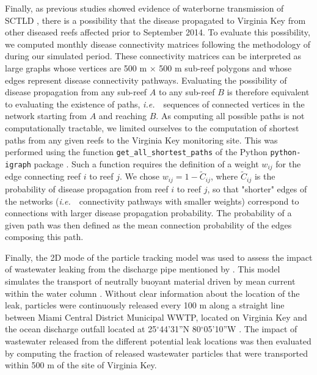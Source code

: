 \documentclass[preprint,12pt,authoryear]{elsarticle}
\newcommand{\ie}{{\it i.e.}\ }
\begin{document}
Finally, as previous studies showed evidence of waterborne transmission of SCTLD \citep{aeby2019pathogenesis, dobbelaere2020coupled,eaton2021measuring, meiling2021variable}, there is a possibility that the disease propagated to Virginia Key from other diseased reefs affected prior to September 2014. To evaluate this possibility, we computed monthly disease connectivity matrices following the methodology of \cite{dobbelaere2020coupled} during our simulated period. These connectivity matrices can be interpreted as large graphs whose vertices are 500 m $\times$ 500 m sub-reef polygons and whose edges represent disease connectivity pathways. Evaluating the possibility of disease propagation from any sub-reef $A$ to any sub-reef $B$ is therefore equivalent to evaluating the existence of paths, \ie~sequences of connected vertices in the network starting from $A$ and reaching $B$. As computing all possible paths is not computationally tractable, we limited ourselves to the computation of shortest paths from any given reefs to the Virginia Key monitoring site. This was performed using the function \texttt{get\_all\_shortest\_paths} of the Python \texttt{python-igraph} package \citep{csardi2006igraph}. Such a function requires the definition of a weight $w_{ij}$ for the edge connecting reef $i$ to reef $j$. We chose $w_{ij} = 1-\tilde{C}_{ij}$, where $\tilde{C}_{ij}$ is the probability of disease propagation from reef $i$ to reef $j$, so that "shorter" edges of the networks (\ie~connectivity pathways with smaller weights) correspond to connections with larger disease propagation probability. The probability of a given path was then defined as the mean connection probability of the edges composing this path.

Finally, the 2D mode of the particle tracking model was used to assess the impact of wastewater leaking from the discharge pipe mentioned by \cite{gintert2019regional}. This model simulates the transport of neutrally buoyant material driven by mean current within the water column \citep{dobbelaere2020coupled}. Without clear information about the location of the leak, particles were continuously released every 100 m along a straight line between Miami Central District Municipal WWTP, located on Virginia Key and the ocean discharge outfall located at 25$^\circ$44'31''N 80$^\circ$05'10''W \citep{koopman2006ocean}. The impact of wastewater released from the different potential leak locations was then evaluated by computing the fraction of released wastewater particles that were transported within 500 m of the site of Virginia Key.
\end{document}
